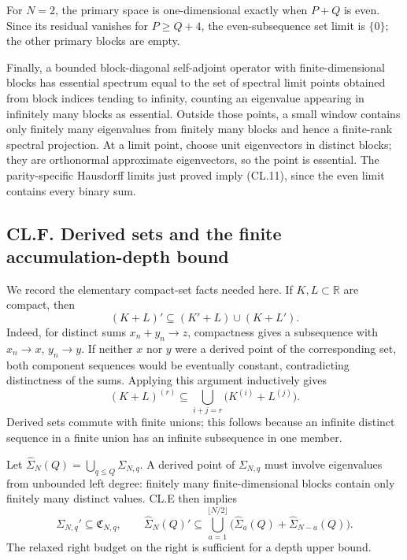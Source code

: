 \documentclass[a4paper,11pt]{article}
\numberwithin{equation}{section}
\begin{document}
For \(N=2\), the primary space is one-dimensional exactly when \(P+Q\) is even. Since its residual vanishes for \(P\geq Q+4\), the even-subsequence set limit is \(\{0\}\); the other primary blocks are empty.

Finally, a bounded block-diagonal self-adjoint operator with finite-dimensional blocks has essential spectrum equal to the set of spectral limit points obtained from block indices tending to infinity, counting an eigenvalue appearing in infinitely many blocks as essential. Outside those points, a small window contains only finitely many eigenvalues from finitely many blocks and hence a finite-rank spectral projection. At a limit point, choose unit eigenvectors in distinct blocks; they are orthonormal approximate eigenvectors, so the point is essential. The parity-specific Hausdorff limits just proved imply (CL.11), since the even limit contains every binary sum.

\hypertarget{cl.f.-derived-sets-and-the-finite-accumulation-depth-bound}{%
\subsection{CL.F. Derived sets and the finite accumulation-depth bound}\label{cl.f.-derived-sets-and-the-finite-accumulation-depth-bound}}

We record the elementary compact-set facts needed here. If \(K,L\subset\mathbb R\) are compact, then \[
(K+L)'\subseteq(K'+L)\cup(K+L').
\tag{CL.F1}
\] Indeed, for distinct sums \(x_n+y_n\to z\), compactness gives a subsequence with \(x_n\to x\), \(y_n\to y\). If neither \(x\) nor \(y\) were a derived point of the corresponding set, both component sequences would be eventually constant, contradicting distinctness of the sums. Applying this argument inductively gives \[
(K+L)^{(r)}
\subseteq\bigcup_{i+j=r}\bigl(K^{(i)}+L^{(j)}\bigr).
\tag{CL.F2}
\] Derived sets commute with finite unions; this follows because an infinite distinct sequence in a finite union has an infinite subsequence in one member.

Let \(\widehat\Sigma_N(Q)=\bigcup_{q\leq Q}\Sigma_{N,q}\). A derived point of \(\Sigma_{N,q}\) must involve eigenvalues from unbounded left degree: finitely many finite-dimensional blocks contain only finitely many distinct values. CL.E then implies \[
\Sigma_{N,q}'\subseteq\mathfrak C_{N,q},\qquad
\widehat\Sigma_N(Q)'
\subseteq
\bigcup_{a=1}^{\lfloor N/2\rfloor}
\bigl(\widehat\Sigma_a(Q)+\widehat\Sigma_{N-a}(Q)\bigr).
\tag{CL.F3}
\] The relaxed right budget on the right is sufficient for a depth upper bound.
\end{document}
